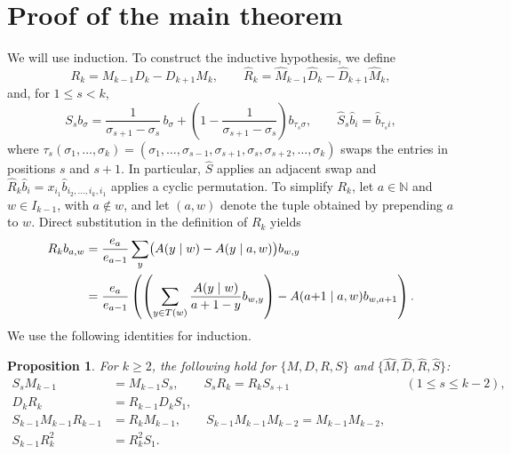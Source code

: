 \documentclass[12pt]{article}
\theoremstyle{plain}
\newtheorem{proposition}[theorem]{Proposition}
\theoremstyle{definition}
\theoremstyle{remark}
\newcommand{\bN}{\mathbb{N}}
\begin{document}
\section{Proof of the main theorem}\label{section:proof}
We will use induction. To construct the inductive hypothesis, we define
\[
R_k=M_{k-1}D_k-D_{k+1}M_k,\qquad \hat R_k=\hat M_{k-1}\hat D_k-\hat D_{k+1}\hat M_k,
\]
and, for $1\le s<k$,
\[
S_sb_\sigma=\frac1{\sigma_{s+1}-\sigma_s}\,b_\sigma
+\left(1-\frac1{\sigma_{s+1}-\sigma_s}\right)b_{\tau_s\sigma},
\qquad \hat S_s\hat b_i=\hat b_{\tau_si},
\]
where $\tau_s(\sigma_1,\dots,\sigma_k)
=(\sigma_1,\dots,\sigma_{s-1},\sigma_{s+1},\sigma_s,\sigma_{s+2},\dots,\sigma_k)$ swaps the entries in positions $s$ and $s+1$.
In particular, $\hat{S}$ applies an adjacent swap and $\hat R_k\hat b_i=x_{i_1}\hat b_{i_2,\dots,i_k,i_1}$ applies a cyclic permutation. To simplify $R_k$, let $a\in\bN$ and $w\in I_{k-1}$, with
$a\notin w$, and let $(a,w)$ denote the tuple obtained by prepending $a$ to $w$. Direct substitution in the definition of $R_k$ yields
\begin{align}
R_kb_{a,w}
&=\frac{e_a}{e_{a-1}}\sum_y
  \bigl(A(y\mid w)-A(y\mid a,w)\bigr)b_{w,y}\notag\\
&=\frac{e_a}{e_{a-1}}\left(
  \left(\sum_{y\in T(w)}\frac{A(y\mid w)}{a+1-y}b_{w,y}\right)
  -A(a{+}1\mid a,w)b_{w,a+1}\right).
\label{eq:R}
\end{align}
We use the following identities for induction.


\begin{proposition}\label{prop:identities}
For $k\ge2$, the following hold for $\{M,D,R,S\}$ and $\{\hat{M},\hat{D},\hat{R},\hat{S}\}$:
\begin{align}
S_sM_{k-1}&=M_{k-1}S_s,\qquad S_sR_k=R_kS_{s+1} &&(1\le s\le k-2),\label{eq:swap-basic}\\
D_kR_k&=R_{k-1}D_kS_1,\label{eq:swap-delete}\\
S_{k-1}M_{k-1}R_{k-1}&=R_kM_{k-1},\qquad
S_{k-1}M_{k-1}M_{k-2}=M_{k-1}M_{k-2},\label{eq:last-swap}\\
S_{k-1}R_k^2&=R_k^2S_1.\label{eq:swap-square}
\end{align}
\end{proposition}
\end{document}
